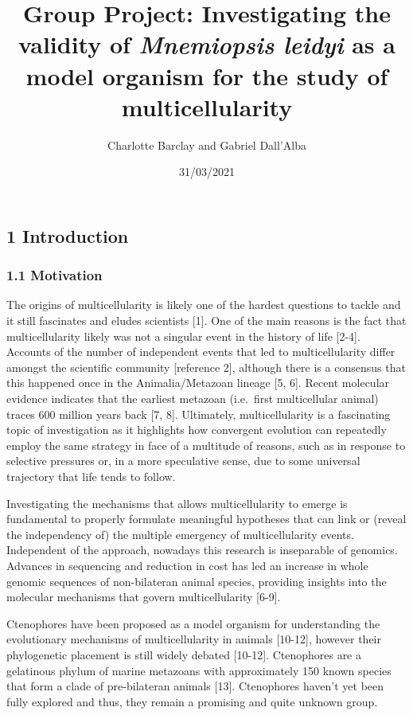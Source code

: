 \documentclass[
]{article}
\title{Group Project: Investigating the validity of \emph{Mnemiopsis
leidyi} as a model organism for the study of multicellularity}
\author{Charlotte Barclay and Gabriel Dall'Alba}
\date{31/03/2021}
\begin{document}
\maketitle

\hypertarget{introduction}{%
\subsection{1 Introduction}\label{introduction}}

\hypertarget{motivation}{%
\subsubsection{1.1 Motivation}\label{motivation}}

The origins of multicellularity is likely one of the hardest questions
to tackle and it still fascinates and eludes scientists {[}1{]}. One of
the main reasons is the fact that multicellularity likely was not a
singular event in the history of life {[}2-4{]}. Accounts of the number
of independent events that led to multicellularity differ amongst the
scientific community {[}reference 2{]}, although there is a consensus
that this happened once in the Animalia/Metazoan lineage {[}5, 6{]}.
Recent molecular evidence indicates that the earliest metazoan
(i.e.~first multicellular animal) traces 600 million years back {[}7,
8{]}. Ultimately, multicellularity is a fascinating topic of
investigation as it highlights how convergent evolution can repeatedly
employ the same strategy in face of a multitude of reasons, such as in
response to selective pressures or, in a more speculative sense, due to
some universal trajectory that life tends to follow.

Investigating the mechanisms that allows multicellularity to emerge is
fundamental to properly formulate meaningful hypotheses that can link or
(reveal the independency of) the multiple emergency of multicellularity
events. Independent of the approach, nowadays this research is
inseparable of genomics. Advances in sequencing and reduction in cost
has led an increase in whole genomic sequences of non-bilateran animal
species, providing insights into the molecular mechanisms that govern
multicellularity {[}6-9{]}.

Ctenophores have been proposed as a model organism for understanding the
evolutionary mechanisms of multicellularity in animals {[}10-12{]},
however their phylogenetic placement is still widely debated
{[}10-12{]}. Ctenophores are a gelatinous phylum of marine metazoans
with approximately 150 known species that form a clade of pre-bilateran
animals {[}13{]}. Ctenophores haven't yet been fully explored and thus,
they remain a promising and quite unknown group.
\end{document}
